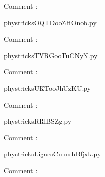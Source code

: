     Comment : 

    \clearpage
    


    \newcommand{\CaptionFigOQTDooZHOnob}{<+Type your caption here+>}
    \begin{center}
        
    \end{center}
    phystricksOQTDooZHOnob.py

    Comment : 

    \clearpage
    


    \newcommand{\CaptionFigTVRGooTuCNyN}{<+Type your caption here+>}
    \begin{center}
        
    \end{center}
    phystricksTVRGooTuCNyN.py

    Comment : 

    \clearpage
    


    \newcommand{\CaptionFigUKTooJhUzKU}{<+Type your caption here+>}
    \begin{center}
        
    \end{center}
    phystricksUKTooJhUzKU.py

    Comment : 

    \clearpage
    


    \newcommand{\CaptionFigRRlBSZg}{<+Type your caption here+>}
    \begin{center}
        
    \end{center}
    phystricksRRlBSZg.py

    Comment : 

    \clearpage
    


    \newcommand{\CaptionFigLignesCubeshBfjxk}{<+Type your caption here+>}
    \begin{center}
        
    \end{center}
    phystricksLignesCubeshBfjxk.py

    Comment : 

    \clearpage
    

